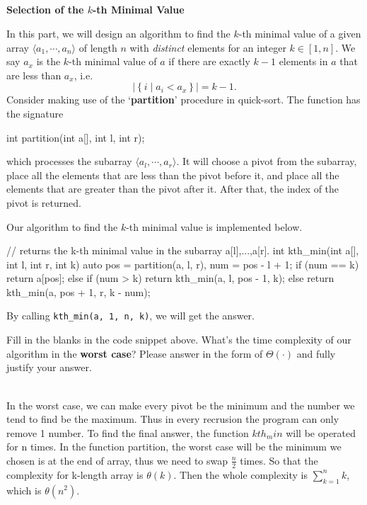 
\begin{parts}
  \part{} \textbf{Selection of the \(k\)-th Minimal Value} \par
  In this part, we will design an algorithm to find the \(k\)-th minimal value of a given array \(\langle a_1,\cdots,a_n\rangle\) of length \(n\) with \emph{distinct} elements for an integer \(k\in[1,n]\). We say \(a_x\) is the \(k\)-th minimal value of \(a\) if there are exactly \(k-1\) elements in \(a\) that are less than \(a_x\), i.e.
  \[\left|\left\{i\mid a_i<a_x\right\}\right|=k-1.\]
  Consider making use of the `\textbf{partition}' procedure in quick-sort. The function has the signature
  \begin{cpp}
    int partition(int a[], int l, int r);
  \end{cpp}
  which processes the subarray \(\langle a_l,\cdots,a_r\rangle\). It will choose a pivot from the subarray, place all the elements that are less than the pivot before it, and place all the elements that are greater than the pivot after it. After that, the index of the pivot is returned.

  Our algorithm to find the \(k\)-th minimal value is implemented below.
  \begin{cpp}
    // returns the k-th minimal value in the subarray a[l],...,a[r].
    int kth_min(int a[], int l, int r, int k) {
        auto pos = partition(a, l, r), num = pos - l + 1;
        if (num == k)
        return a[pos];
        else if (num > k)
        return kth_min(a, l, pos - 1, k);
        else
        return kth_min(a, pos + 1, r, k - num);
      }
  \end{cpp}
  By calling \lstinline{kth_min(a, 1, n, k)}, we will get the answer.

  \begin{subparts}
    \subpart[2] Fill in the blanks in the code snippet above.
    \subpart[2] What's the time complexity of our algorithm in the \textbf{worst case}? Please answer in the form of \(\Theta(\cdot)\) and fully justify your answer.
    \begin{solution} \\
      In the worst case, we can make every pivot be the minimum and the number we tend to find be the maximum.
      Thus in every recrusion the program can only remove 1 number. To find the final answer, the function $kth_min$
      will be operated for n times. In the function partition, the worst case will be the minimum we chosen is
      at the end of array, thus we need to swap $\frac{n}{2}$ times. So that the complexity for k-length array
      is $\theta(k)$. Then the whole complexity is $\sum_{k=1}^{n}k$, which is $\theta(n^2)$.
    \end{solution}
  \end{subparts}


\end{parts}
